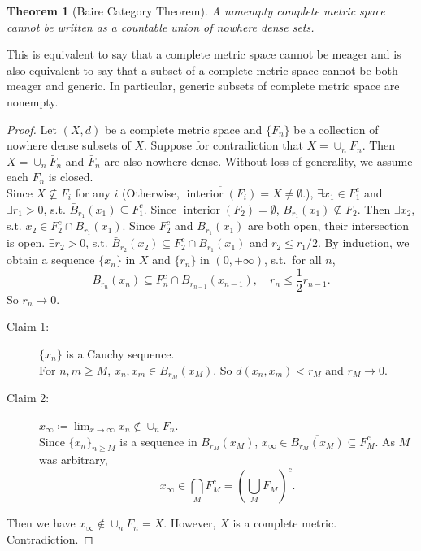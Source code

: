 \documentclass[12pt]{article}
\DeclareMathOperator{\interior}{interior}
\theoremstyle{plain}
\newtheorem{thm}{Theorem}
\theoremstyle{definition}
\begin{document}
\begin{thm}[Baire Category Theorem]\label{thm:5}
    A nonempty complete metric space cannot be written as a countable union of nowhere
    dense sets.
\end{thm}
    This is equivalent to say that a complete metric space cannot be meager and
    is also equivalent to say that a subset of a complete metric space cannot be
    both meager and generic.
    In particular, generic subsets of complete metric space are nonempty.
\begin{proof}
    Let $(X,d)$ be a complete metric space and $\{F_n\}$ be a collection of
    nowhere dense subsets of $X$.
    Suppose for contradiction that $X=\cup_nF_n$.
    Then $X=\cup_n\bar{F}_n$ and $\bar{F}_n$ are also nowhere dense.
    Without loss of generality, we assume each $F_n$ is closed.\\
    Since $X\nsubseteq F_i$ for any $i$ (Otherwise, $\overline{\interior
    (F_i)}=X\neq\emptyset$.),
    $\exists x_1\in F_1^c$ and $\exists r_1>0$, s.t.
    $\bar{B}_{r_1}(x_1)\subseteq F_1^c$.
    Since $\interior(F_2)=\emptyset$, $B_{r_1}(x_1)\nsubseteq F_2$.
    Then $\exists x_2$, s.t. $x_2\in F_2^c\cap B_{r_1}(x_1)$.
    Since $F_2^c$ and $B_{r_1}(x_1)$ are both open, their intersection is open.
    $\exists r_2>0$, s.t. $\bar{B}_{r_2}(x_2)\subseteq F_2^c\cap B_{r_1}(x_1)$ and
    $r_2\leq r_1/2$.
    By induction, we obtain a sequence $\{x_n\}$ in $X$ and $\{r_n\}$ in
    $(0,+\infty)$, s.t.\ for all $n$,
    $$B_{r_n}(x_n)\subseteq F_n^c\cap B_{r_{n-1}}(x_{n-1}),\quad
    r_n\leq\frac{1}{2}r_{n-1}.$$
    So $r_n\rightarrow0$.
    \begin{description}
        \item[Claim 1:]
            $\{x_n\}$ is a Cauchy sequence.\\
            For $n,m\geq M$, $x_n, x_m\in B_{r_M}(x_M)$.
            So $d(x_n,x_m)<r_M$ and $r_M\rightarrow0$.
        \item[Claim 2:]
            $x_\infty\coloneqq \lim_{x\rightarrow\infty}x_n\notin\cup_n F_n$.\\
            Since $\{x_n\}_{n\geq M}$ is a sequence in $B_{r_M}(x_M)$,
            $x_\infty\in\overline{B_{r_M}(x_M)}\subseteq F_M^c$.
            As $M$ was arbitrary,
            $$x_\infty\in\bigcap_M F_M^c=\left(\bigcup_M F_M\right)^c.$$
    \end{description}
    Then we have $x_\infty\notin \cup_{n}F_n=X$.
    However, $X$ is a complete metric. Contradiction.
\end{proof}
\end{document}

